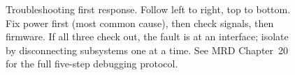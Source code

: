 \begin{figure}[htbp]
{%
}%
\caption{Troubleshooting first response. Follow left to right, top to bottom. Fix power first (most common cause), then check signals, then firmware. If all three check out, the fault is at an interface; isolate by disconnecting subsystems one at a time. See MRD Chapter~20 for the full five-step debugging protocol.}
\end{figure}
